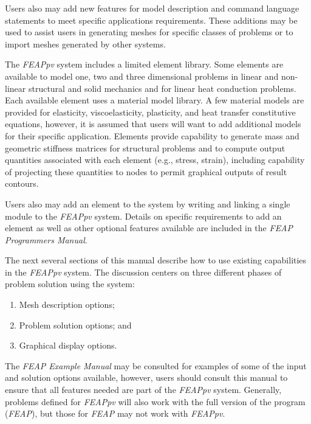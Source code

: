 Users also may add new features for model description and command language
statements to meet specific applications requirements. These additions 
may be used to assist users in generating meshes
for specific classes of problems or to import meshes generated by other
systems.

The {\sl FEAPpv} system includes a limited element library.
Some elements are available to model one, two and three dimensional problems
in linear and non-linear
structural and solid mechanics and for linear heat conduction problems.
Each available element uses a material
model library. A few material models are provided for elasticity,
viscoelasticity, plasticity, and heat transfer constitutive equations,
however, it is assumed that users will want to add additional models for
their specific application.
Elements provide capability to generate mass and
geometric stiffness matrices for structural problems and to compute output
quantities associated with each element (e.g., stress, strain), including
capability of projecting these quantities to nodes to permit graphical
outputs of result contours.

Users also may add an element to the system by writing and linking a single
module to the {\sl FEAPpv} system. Details on
specific requirements to add an element as well as other optional
features available are included in the
{\sl FEAP Programmers Manual}.

The next several sections of this manual describe how to use existing
capabilities in the {\sl FEAPpv} system.  The discussion
centers on three different phases of problem solution using the system:
\begin{enumerate}
\item Mesh description options;
\item Problem solution options; and
\item Graphical display options.
\end{enumerate}
The {\sl FEAP Example Manual}
may be consulted for examples of some of the input and solution
options available, however, users should consult this manual to ensure that
all features needed are part of the \textsl{FEAPpv} system.
Generally, problems defined for \textsl{FEAPpv} will also work with the full version
of the program (\textsl{FEAP}), but those for \textsl{FEAP} may not work with
\textsl{FEAPpv}.

